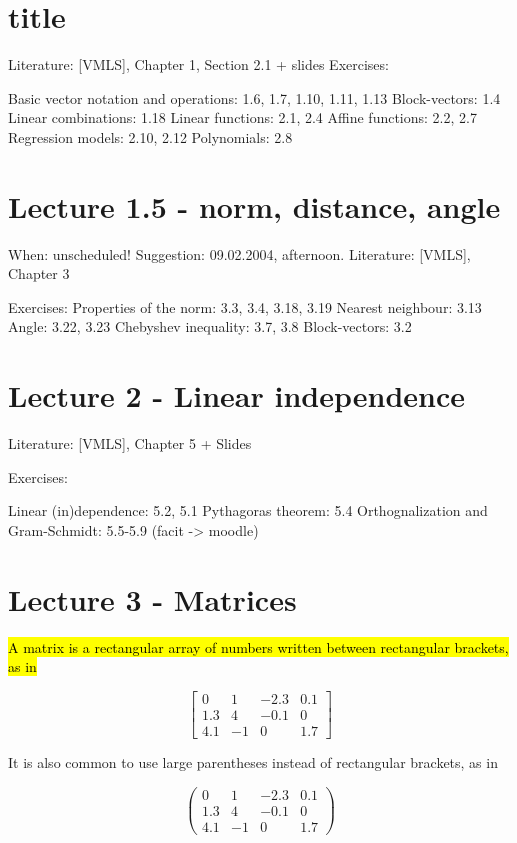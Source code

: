 \documentclass[11pt,oneside,a4paper,openright]{article}
\begin{document}
\section*{title}

Literature: [VMLS], Chapter 1, Section 2.1 + slides
Exercises:

Basic vector notation and operations: 1.6, 1.7, 1.10, 1.11, 1.13
Block-vectors: 1.4
Linear combinations: 1.18
Linear functions: 2.1, 2.4
Affine functions: 2.2, 2.7
Regression models: 2.10, 2.12
Polynomials: 2.8

\section*{Lecture 1.5 - norm, distance, angle}

When: unscheduled!  Suggestion: 09.02.2004, afternoon.
Literature: [VMLS], Chapter 3

Exercises:
Properties of the norm: 3.3, 3.4, 3.18, 3.19
Nearest neighbour: 3.13
Angle: 3.22, 3.23
Chebyshev inequality: 3.7, 3.8
Block-vectors: 3.2

\section*{Lecture 2 - Linear independence}

Literature: [VMLS], Chapter 5 + Slides

Exercises:

Linear (in)dependence: 5.2, 5.1
Pythagoras theorem: 5.4
Orthognalization and Gram-Schmidt: 5.5-5.9
(facit -> moodle)

\section*{Lecture 3 - Matrices}
\hl{A matrix is a rectangular array of numbers written between rectangular brackets, as in}

\begin{equation}
\begin{bmatrix}
    0 & 1 & -2.3 & 0.1\\
    1.3 & 4 & -0.1 & 0\\
    4.1 & -1 & 0 & 1.7
\end{bmatrix}    
\end{equation}

It is also common to use large parentheses instead of rectangular brackets, as in

\begin{equation}
\begin{pmatrix}
    0 & 1 & -2.3 & 0.1\\
    1.3 & 4 & -0.1 & 0\\
    4.1 & -1 & 0 & 1.7
\end{pmatrix}    
\end{equation}
\end{document}
